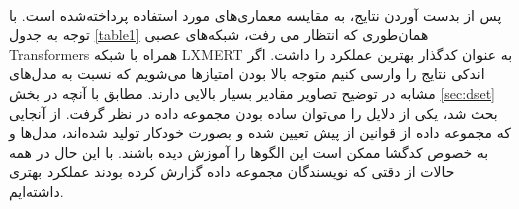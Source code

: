 \paragraph{}{
    پس از بدست آوردن نتایج،‌ به مقایسه معماری‌های مورد استفاده پرداخته‌شده است. 
    با توجه به جدول
    \ref{table1}
    همان‌طوری که انتظار می رفت، شبکه‌های عصبی 
    Transformers
    همراه با شبکه LXMERT
    به عنوان کدگذار بهترین عملکرد را داشت. اگر اندکی نتایج را وارسی کنیم
    متوجه بالا بودن امتیازها می‌شویم که 
    نسبت به مدل‌های مشابه در توضیح تصاویر مقادیر بسیار بالایی دارند. مطابق با آنچه در بخش
    \ref{sec:dset}
    بحث شد، یکی از دلایل را می‌توان ساده‌ بودن مجموعه داده در نظر گرفت. از آنجایی 
    که مجموعه داده از قوانین از پیش تعیین شده و بصورت خودکار تولید شده‌اند، مدل‌ها 
    و به خصوص کدگشا ممکن است این الگوها را آموزش دیده باشند. با این حال در 
    همه حالات از دقتی که نویسندگان مجموعه داده گزارش کرده‌ بودند عملکرد بهتری داشته‌ایم. 
    
}
